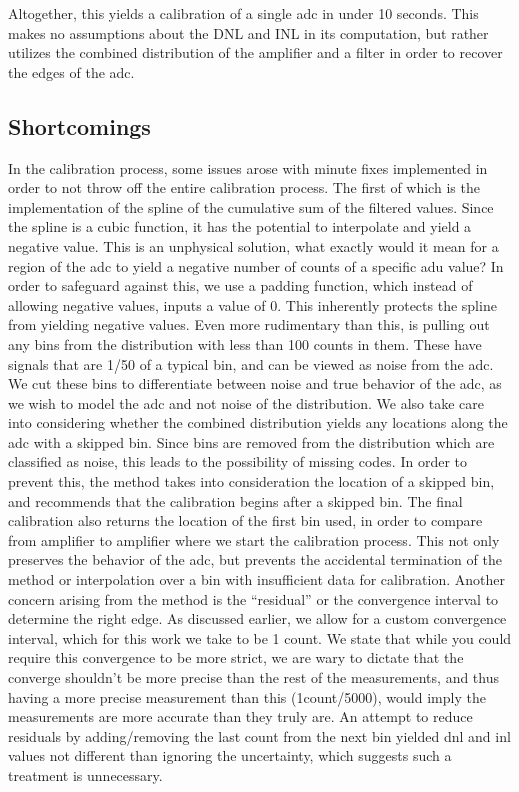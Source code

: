 \documentclass[11pt, letterpaper]{article}
\begin{document}
Altogether, this yields a calibration of a single adc in under 10 seconds. This makes no assumptions about the DNL and INL in its computation, but rather utilizes the combined distribution of the amplifier and a filter in order to recover the edges of the adc.  

\subsection{Shortcomings}
In the calibration process, some issues arose with minute fixes implemented in order to not throw off the entire calibration process. The first of which is the implementation of the spline of the cumulative sum of the filtered values. Since the spline is a cubic function, it has the potential to interpolate and yield a negative value. This is an unphysical solution, what exactly would it mean for a region of the adc to yield a negative number of counts of a specific adu value? In order to safeguard against this, we use a padding function, which instead of allowing negative values, inputs a value of 0. This inherently protects the spline from yielding negative values. 
Even more rudimentary than this, is pulling out any bins from the distribution with less than 100 counts in them. These have signals that are 1/50 of a typical bin, and can be viewed as noise from the adc. We cut these bins to differentiate between noise and true behavior of the adc, as we wish to model the adc and not noise of the distribution. We also take care into considering whether the combined distribution yields any locations along the adc with a skipped bin. Since bins are removed from the distribution which are classified as noise, this leads to the possibility of missing codes. In order to prevent this, the method takes into consideration the location of a skipped bin, and recommends that the calibration begins after a skipped bin. The final calibration also returns the location of the first bin used, in order to compare from amplifier to amplifier where we start the calibration process. This not only preserves the behavior of the adc, but prevents the accidental termination of the method or interpolation over a bin with insufficient data for calibration. 
Another concern arising from the method is the “residual” or the convergence interval to determine the right edge. As discussed earlier, we allow for a custom convergence interval, which for this work we take to be 1 count. We state that while you could require this convergence to be more strict, we are wary to dictate that the converge shouldn’t be more precise than the rest of the measurements, and thus having a more precise measurement than this (1count/5000), would imply the measurements are more accurate than they truly are. An attempt to reduce residuals by adding/removing the last count from the next bin yielded dnl and inl values not different than ignoring the uncertainty, which suggests such a treatment is unnecessary. 
\end{document}
